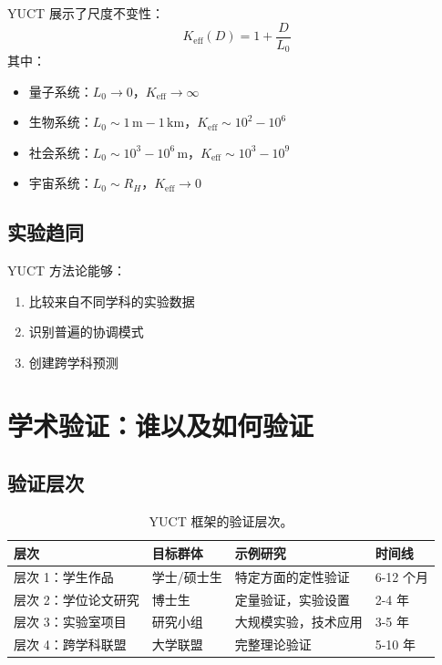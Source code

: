 \documentclass[12pt,a4paper]{article}
\begin{document}
	YUCT 展示了尺度不变性：
	\[
	K_{\mathrm{eff}}(D) = 1 + \frac{D}{L_0}
	\]
	其中：
	\begin{itemize}
		\item 量子系统：$L_0 \to 0$，$K_{\mathrm{eff}} \to \infty$
		\item 生物系统：$L_0 \sim 1\,\mathrm{m}-1\,\mathrm{km}$，$K_{\mathrm{eff}} \sim 10^2-10^6$
		\item 社会系统：$L_0 \sim 10^3-10^6\,\mathrm{m}$，$K_{\mathrm{eff}} \sim 10^3-10^9$
		\item 宇宙系统：$L_0 \sim R_H$，$K_{\mathrm{eff}} \to 0$
	\end{itemize}
	
	\subsection{实验趋同}
	
	YUCT 方法论能够：
	\begin{enumerate}
		\item 比较来自不同学科的实验数据
		\item 识别普遍的协调模式
		\item 创建跨学科预测
	\end{enumerate}
	
	\section{学术验证：谁以及如何验证}
	
	\subsection{验证层次}
	
	\begin{table}[h]
		\centering
		\begin{tabular}{p{}p{}p{}p{}}
			\toprule
			\textbf{层次} & \textbf{目标群体} & \textbf{示例研究} & \textbf{时间线} \\
			\midrule
			层次 1：学生作品 & 学士/硕士生 & 特定方面的定性验证 & 6-12 个月 \\
			层次 2：学位论文研究 & 博士生 & 定量验证，实验设置 & 2-4 年 \\
			层次 3：实验室项目 & 研究小组 & 大规模实验，技术应用 & 3-5 年 \\
			层次 4：跨学科联盟 & 大学联盟 & 完整理论验证 & 5-10 年 \\
			\bottomrule
		\end{tabular}
		\caption{YUCT 框架的验证层次。}
		\label{tab:verification-levels}
	\end{table}
	
\end{document}
